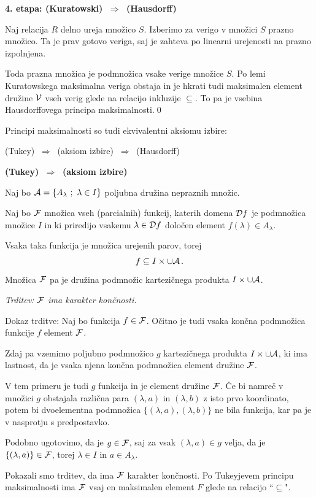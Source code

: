 \documentclass[11pt,paper=b5,DIV=13,headinclude,footinclude]{scrbook}
\def\sledi {{~\Rightarrow~}}
\begin{document}
\bigskip
\textbf{4. etapa: (Kuratowski) $\sledi$ (Hausdorff)}

Naj relacija $R$ delno ureja množico $S$. Izberimo za verigo v množici $S$ prazno množico. Ta je prav gotovo veriga, saj je zahteva po linearni urejenosti na prazno izpolnjena.

Toda prazna množica je podmnožica vsake verige množice $S$. Po lemi Kuratowskega maksimalna veriga obstaja
in je
hkrati tudi maksimalen element družine ${\cal V}$ vseh verig glede na relacijo inkluzije $\subseteq$.
To pa je vsebina Hausdorffovega principa maksimalnosti.\qed

%
\bigskip

Principi maksimalnosti so tudi ekvivalentni aksiomu izbire:

(Tukey) $\sledi$ (aksiom izbire) $\sledi$ (Hausdorff)

\bigskip
\textbf{(Tukey) $\sledi$ (aksiom izbire)}

Naj bo ${\cal A} = \{A_\lambda~;~\lambda\in I\}$ poljubna družina nepraznih množic.

Naj bo ${\cal F}$ množica vseh (parcialnih) funkcij, katerih domena ${\cal D}f$ je podmnožica
množice $I$ in ki priredijo vsakemu $\lambda\in {\cal D}f$ določen element $f(\lambda)\in A_\lambda$.

Vsaka taka funkcija je množica urejenih parov, torej
$$f\subseteq I\times \cup {\cal A}\,.$$
Množica ${\cal F}$ pa je družina podmnožic kartezičnega produkta $I\times \cup {\cal A}$.

\emph{ Trditev: ${\cal F}$ ima karakter končnosti.}

Dokaz trditve: Naj bo funkcija $f\in{\cal F}$. Očitno je tudi vsaka končna podmnožica funkcije $f$ element ${\cal F}$.

Zdaj pa vzemimo poljubno podmnožico $g$ kartezičnega produkta $I\times \cup {\cal A}$,
ki ima lastnost, da je vsaka njena končna podmnožica element družine ${\cal F}$.

V tem primeru je tudi $g$ funkcija in je element družine ${\cal F}$. Če bi namreč v množici $g$ obstajala različna para $(\lambda,a)$ in $(\lambda,b)$ z isto prvo koordinato, potem bi dvoelementna podmnožica $\{(\lambda,a),(\lambda,b)\}$ ne bila funkcija, kar pa je v nasprotju s predpostavko.

Podobno ugotovimo, da je $g\in {\cal F}$, saj za vsak $(\lambda,a)\in g$ velja, da je
$\{(\lambda,a)\}\in {\cal F}$, torej $\lambda\in I$ in $a\in A_\lambda$.

Pokazali smo trditev, da ima ${\cal F}$ karakter končnosti.
Po Tukeyjevem principu maksimalnosti ima ${\cal F}$ vsaj en maksimalen element $F$ glede na relacijo ``$\subseteq$".
\end{document}

